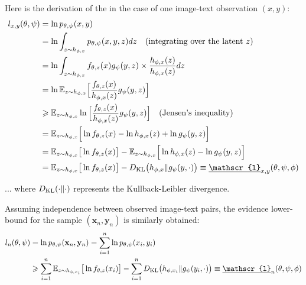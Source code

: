 \documentclass{article}
\begin{document}
\begin{appendix}
Here is the derivation of the  in the case of one image-text observation $(x,y)$:
\begin{align*}
l_{x,y}(\theta,\psi)&=\ln p_{\theta,\psi}(x,y)\\
&=\ln \int_{z \sim h_{\phi,x}} p_{\theta,\psi}(x,y,z) dz  \quad \text{(integrating over the latent $z$)} \\
&=\ln \int_{z \sim h_{\phi,x}} f_{\theta,z}(x)g_\psi(y,z)\times\frac{h_{\phi,x}(z)}{h_{\phi,x}(z)} dz \\
&=\ln \mathbb{E}_{z \sim h_{\phi,x}} \Big[ \frac{f_{\theta,z}(x)}{h_{\phi,x}(z)}g_\psi(y,z)  \Big]\\
&\geqslant  \mathbb{E}_{z \sim h_{\phi,x}} \ln \Big[ \frac{f_{\theta,z}(x)}{h_{\phi,x}(z)}g_\psi(y,z)  \Big] \quad \text{(Jensen's inequality)} \\
& = \mathbb{E}_{z \sim h_{\phi,x}} \Big[ \ln f_{\theta,z}(x) - \ln h_{\phi,x}(z) + \ln g_\psi(y,z)  \Big] \\
& = \mathbb{E}_{z \sim h_{\phi,x}} \big[ \ln f_{\theta,z}(x) \big]- \mathbb{E}_{z \sim h_{\phi,x}}\Big[\ln h_{\phi,x}(z) - \ln g_\psi(y,z)  \Big] \\
& = \mathbb{E}_{z \sim h_{\phi,x}} \big[ \ln f_{\theta,z}(x) \big]-\KL \big(h_{\phi,x} \| g_\psi(y,\cdot) \big) \equiv \underline{\mathscr{l}}_{x,y}(\theta,\psi,\phi)
\end{align*}

... where $D_{\mathrm{KL}}(\cdot\|\cdot)$ represents the Kullback-Leibler divergence.

Assuming independence between observed image-text pairs, the evidence lower-bound for the sample $(\mathbf{x}_n,\mathbf{y}_n)$ is similarly obtained:
\begin{align*}
l_n(\theta,\psi)&=\ln p_{\theta,\psi}(\mathbf{x}_n,\mathbf{y}_n)=\sum_{i=1}^n \ln p_{\theta,\psi}(x_i,y_i)\\
&\geqslant \sum_{i=1}^n \mathbb{E}_{z \sim h_{\phi,x_i}} \big[ \ln f_{\theta,z}(x_i) \big]-\sum_{i=1}^n \KL \big(h_{\phi,x_i} \| g_\psi(y_i,\cdot) \big) \equiv \underline{\mathscr{l}}_n(\theta,\psi,\phi)
\end{align*}

\clearpage

\begin{multicols}{2}



\end{multicols}
\end{appendix}
\end{document}
